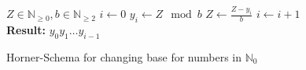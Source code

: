\documentclass{article}
\begin{document}
\begin{preview}
    \begin{algorithm}[H]
        \begin{algorithmic}
            \Require $Z \in \mathbb{N}_{\geq 0}, b \in \mathbb{N}_{\geq 2}$
            \State $i\gets 0$
                \State $y_i\gets Z \mod b$
                \State $Z \gets \frac{Z - y_i}{b}$
                \State $i \gets i + 1$
            \EndWhile
            \\
            \State \textbf{Result:} $y_{0} y_{1} \dots y_{i-1}$
        \end{algorithmic}
    \caption{Horner-Schema for changing base for numbers in $\mathbb{N}_0$}
    \label{alg:hornerschemaGanzeZahlen}
    \end{algorithm}
\end{preview}
\end{document}
